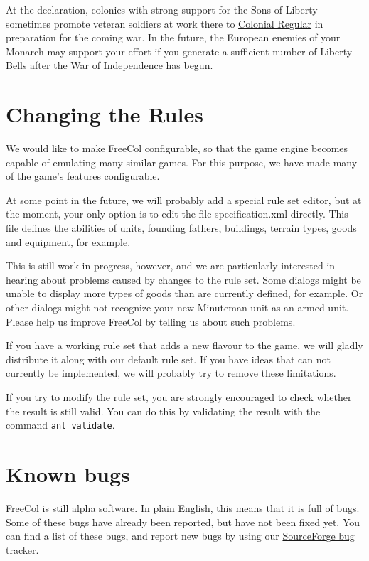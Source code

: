 \documentclass[12pt]{article}
\begin{document}
At the declaration, colonies with strong support for the Sons of
Liberty sometimes promote veteran soldiers at work there to
\hyperlink{Colonial Regular}{Colonial Regular} in preparation for the
coming war.  In the future, the European enemies of your Monarch may
support your effort if you generate a sufficient number of Liberty
Bells after the War of Independence has begun.


\hypertarget{Changing the Rules}{\section{Changing the Rules}}

We would like to make FreeCol configurable, so that the game engine
becomes capable of emulating many similar games. For this purpose,
we have made many of the game's features configurable.

At some point in the future, we will probably add a special rule set
editor, but at the moment, your only option is to edit the file
specification.xml directly. This file defines the abilities of units,
founding fathers, buildings, terrain types, goods and equipment, for
example.

This is still work in progress, however, and we are particularly
interested in hearing about problems caused by changes to the rule
set. Some dialogs might be unable to display more types of goods than
are currently defined, for example. Or other dialogs might not
recognize your new Minuteman unit as an armed unit. Please help us
improve FreeCol by telling us about such problems.

If you have a working rule set that adds a new flavour to the game, we
will gladly distribute it along with our default rule set. If you have
ideas that can not currently be implemented, we will probably try to
remove these limitations.

If you try to modify the rule set, you are strongly encouraged to
check whether the result is still valid. You can do this by validating
the result with the command \verb$ant validate$.


\hypertarget{Known bugs}{\section{Known bugs}}

FreeCol is still alpha software. In plain English, this means that it
is full of bugs. Some of these bugs have already been reported, but
have not been fixed yet. You can find a list of these bugs, and report
new bugs by using our
\href{http://sourceforge.net/tracker/?group_id=43225&atid=435578}{SourceForge
bug tracker}.
\end{document}
